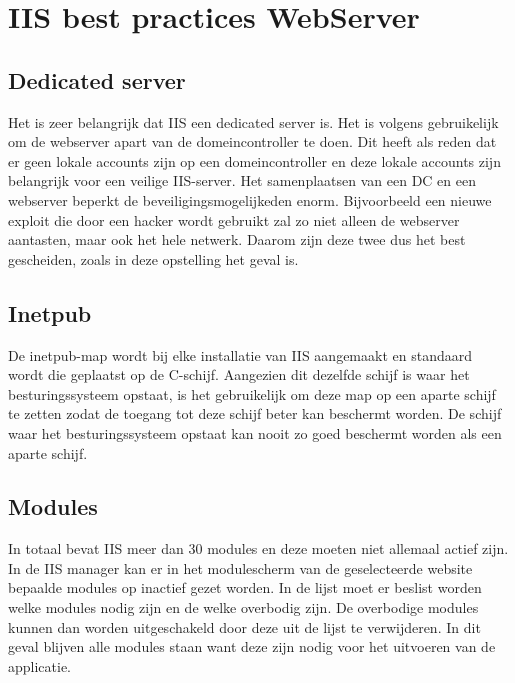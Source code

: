 \documentclass[pdftex,a4paper,12pt]{report}
\begin{document}
\section{IIS best practices WebServer}
\subsection{Dedicated server}
Het is zeer belangrijk dat IIS een dedicated server is. Het is volgens \cite{Microsoft2013} gebruikelijk om de webserver apart van de domeincontroller te doen. Dit heeft als reden dat er geen lokale accounts zijn op een domeincontroller en deze lokale accounts zijn belangrijk voor een veilige IIS-server. Het samenplaatsen van een DC en een webserver beperkt de beveiligingsmogelijkeden enorm. Bijvoorbeeld een nieuwe exploit die door een hacker wordt gebruikt zal zo niet alleen de webserver aantasten, maar ook het hele netwerk. Daarom zijn deze twee dus het best gescheiden, zoals in deze opstelling het geval is.

\subsection{Inetpub}
De inetpub-map wordt bij elke installatie van IIS aangemaakt en standaard wordt die geplaatst op de C-schijf. Aangezien dit dezelfde schijf is waar het besturingssysteem opstaat, is het gebruikelijk om deze map op een aparte schijf te zetten zodat de toegang tot deze schijf beter kan beschermt worden. De schijf waar het besturingssysteem opstaat kan nooit zo goed beschermt worden als een aparte schijf. \citep{Darmanin2014}

\subsection{Modules}
In totaal bevat IIS meer dan 30 modules en deze moeten niet allemaal actief zijn. In de IIS manager kan er in het modulescherm van de geselecteerde website bepaalde modules op inactief gezet worden. In de lijst moet er beslist worden welke modules nodig zijn en de welke overbodig zijn. De overbodige modules kunnen dan worden uitgeschakeld door deze uit de lijst te verwijderen. In dit geval blijven alle modules staan want deze zijn nodig voor het uitvoeren van de applicatie. \citep{Darmanin2014} \citep{Microsoft2013}
\end{document}
